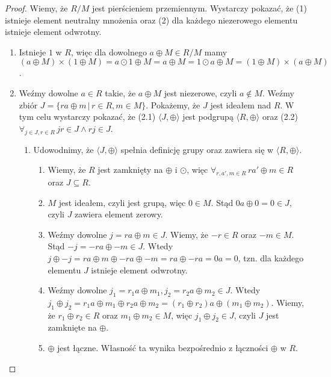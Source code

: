 \documentclass[declaration,shortabstract]{iithesis}
\theoremstyle{definition}
\theoremstyle{remark} \newtheorem{observation}{Obserwacja}
\theoremstyle{plain} \newtheorem{theorem}{Twierdzenie}
\theoremstyle{plain} \newtheorem{lemma}{Lemat}
\theoremstyle{remark} \newtheorem*{remark*}{Uwaga}
\theoremstyle{reminder} \newtheorem*{reminder*}{Przypomnienie}
\begin{document}
\begin{proof}
    Wiemy, że $R/M$ jest pierścieniem przemiennym. Wystarczy pokazać, że (1) istnieje element neutralny mnożenia oraz (2) dla każdego niezerowego elementu istnieje element odwrotny.
    \begin{enumerate}[label=(\arabic*),leftmargin=.4in]
        \item Istnieje $1$ w $R$, więc dla dowolnego $a \oplus M \in R/M$ mamy
        $(a \oplus M) \times (1 \oplus M) = a \odot 1 \oplus M = a \oplus M = 1 \odot a \oplus M = (1 \oplus M) \times (a \oplus M)$.
        \item Weźmy dowolne $a \in R$ takie, że $a \oplus M$ jest niezerowe, czyli $a \notin M$. Weźmy zbiór $J = \{ra \oplus m \, | \, r \in R, m \in M\}$. Pokażemy, że $J$ jest ideałem nad $R$. W tym celu wystarczy pokazać, że (2.1) $\langle J, \oplus \rangle$ jest podgrupą $\langle R, \oplus \rangle$ oraz (2.2)$\forall_{j \in J, r \in R} \, jr \in J \wedge rj \in J$.
        \begin{enumerate}[label=(2.\arabic*)]
            \item Udowodnimy, że $\langle J, \oplus \rangle$ spełnia definicję grupy oraz zawiera się w $\langle R, \oplus \rangle$.
            \begin{enumerate}[label=(2.1.\arabic*)]
                \item Wiemy, że $R$ jest zamknięty na $\oplus$ i $\odot$, więc $\forall_{r, a', m \in R} \, ra' \oplus m \in R$ oraz $J \subseteq R$. 
                \item $M$ jest ideałem, czyli jest grupą, więc $0 \in M$. Stąd $0a \oplus 0 = 0 \in J$, czyli $J$ zawiera element zerowy.
                \item Weźmy dowolne $j = ra \oplus m \in J$. Wiemy, że $-r \in R$ oraz $-m \in M$. Stąd $-j = -ra \oplus -m \in J$. Wtedy $j \oplus -j = ra \oplus m \oplus -ra \oplus -m = ra \oplus -ra = 0a = 0$, tzn. dla każdego elementu $J$ istnieje element odwrotny.
                \item Weźmy dowolne $j_1 = r_1a \oplus m_1, j_2 = r_2a \oplus m_2 \in J$. Wtedy $j_1 \oplus j_2 = r_1a \oplus m_1 \oplus r_2a \oplus m_2 = (r_1 \oplus r_2)a \oplus (m_1 \oplus m_2)$. Wiemy, że $r_1 \oplus r_2 \in R$ oraz $m_1 \oplus m_2 \in M$, więc $j_1 \oplus j_2 \in J$, czyli $J$ jest zamknięte na $\oplus$.
                \item $\oplus$ jest łączne. Własność ta wynika bezpośrednio z łączności $\oplus$ w $R$.
            \end{enumerate}

\end{enumerate}
\end{enumerate}
\end{proof}
\end{document}
